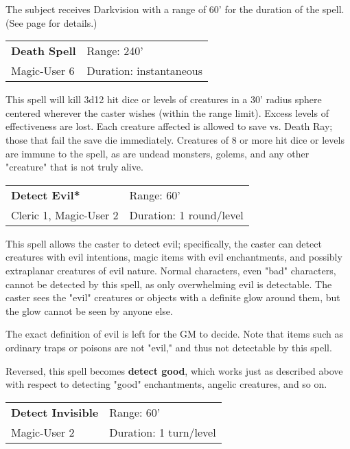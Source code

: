 \documentclass[a4paper,twoside,openany,10pt]{book}
\begin{document}
\begin{multicols}{2}
The subject receives Darkvision with a range of 60' for the duration of the spell. (See page \hyperlink{darkvision}{\pageref{darkvision}} for details.)

\smallskip\begin{flushleft} 
	\begin{tabularx}{0.45\textwidth}{@{}m{3.5cm}m{5.5cm}@{}} 
		\textbf{Death Spell} & Range: 240'\\
Magic-User 6 & Duration: instantaneous\\
	\end{tabularx}\end{flushleft}

This spell will kill 3d12 hit dice or levels of creatures in a 30'{} radius sphere centered wherever the caster wishes (within the range limit). Excess levels of effectiveness are lost. Each creature affected is allowed to save vs. Death Ray; those that fail the save die immediately. Creatures of 8 or more hit dice or levels are immune to the spell, as are undead monsters, golems, and any other "creature" that is not truly alive.

\smallskip\begin{flushleft} 
	\begin{tabularx}{0.45\textwidth}{@{}m{3.5cm}m{5.5cm}@{}} 
		\textbf{Detect Evil*} & Range: 60'\\
Cleric 1, Magic-User 2 & Duration: 1 round/level\\
	\end{tabularx}\end{flushleft}

This spell allows the caster to detect evil; specifically, the caster can detect creatures with evil intentions, magic items with evil enchantments, and possibly extraplanar creatures of evil nature. Normal characters, even "bad" characters, cannot be detected by this spell, as only overwhelming evil is detectable. The caster sees the "evil" creatures or objects with a definite glow around them, but the glow cannot be seen by anyone else.

The exact definition of evil is left for the GM to decide. Note that items such as ordinary traps or poisons are not "evil," and thus not detectable by this spell.

Reversed, this spell becomes \textbf{detect good}, which works just as described above with respect to detecting "good" enchantments, angelic creatures, and so on.

\smallskip\begin{flushleft} 
	\begin{tabularx}{0.45\textwidth}{@{}m{3.5cm}m{5.5cm}@{}} 
		\textbf{Detect Invisible} & Range: 60'\\
Magic-User 2 & Duration: 1 turn/level\\
	\end{tabularx}\end{flushleft}


\end{multicols}
\end{document}
